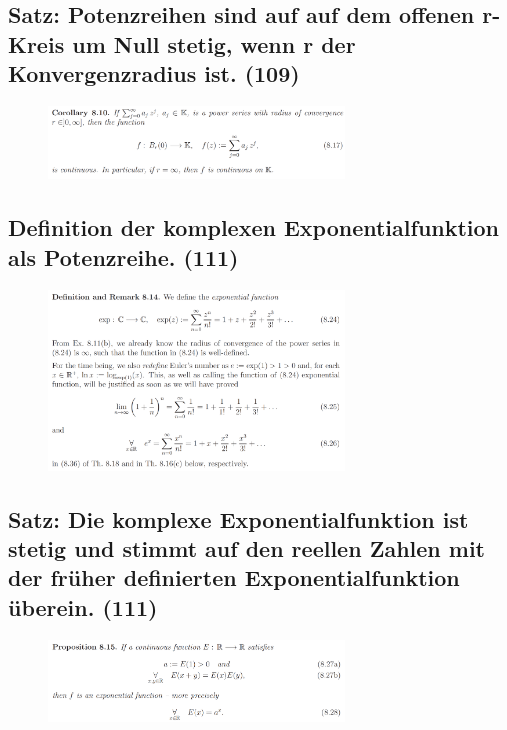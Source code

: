 \subsection{Satz: Potenzreihen sind auf auf dem offenen r-Kreis um Null stetig, wenn r der Konvergenzradius ist. (109)}

\begin{figure}[H] \centering
\includegraphics[width=0.7\textwidth]{media/8-18.png}
\end{figure}

\subsection{Definition der komplexen Exponentialfunktion als Potenzreihe. (111)}

\begin{figure}[H] \centering
\includegraphics[width=0.7\textwidth]{media/8-19.png}
\end{figure}

\subsection{Satz: Die komplexe Exponentialfunktion ist stetig und stimmt auf den reellen Zahlen mit der früher definierten Exponentialfunktion überein. (111)} 

\begin{figure}[H] \centering
\includegraphics[width=0.7\textwidth]{media/8-20.png}
\end{figure}

